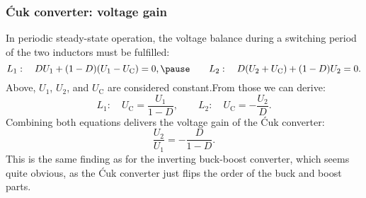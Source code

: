 
\begin{frame}
    \frametitle{Ćuk converter: voltage gain}
    In periodic steady-state operation, the voltage balance during a switching period of the two inductors must be fulfilled:
    \begin{equation}
        L_1:\quad D U_1 + (1-D)(U_1-U_\mathrm{C})=0, \pause \qquad L_2:\quad D(U_2+U_\mathrm{C}) + (1-D)U_2=0.
    \end{equation}
    Above, $U_1$, $U_2$, and $U_\mathrm{C}$ are considered constant.\pause From those we can derive:
    \begin{equation}
        L_1:\quad U_\mathrm{C}=\frac{U_1}{1-D}, \qquad L_2:\quad U_\mathrm{C}=-\frac{U_2}{D}.
    \end{equation}\pause
    Combining both equations delivers the voltage gain of the Ćuk converter:
    \begin{equation}
        \frac{U_2}{U_1} = -\frac{D}{1-D}.
    \end{equation}\pause
    This is the same finding as for the inverting buck-boost converter, which seems quite obvious, as the Ćuk converter just flips the order of the buck and boost parts. 
\end{frame}

